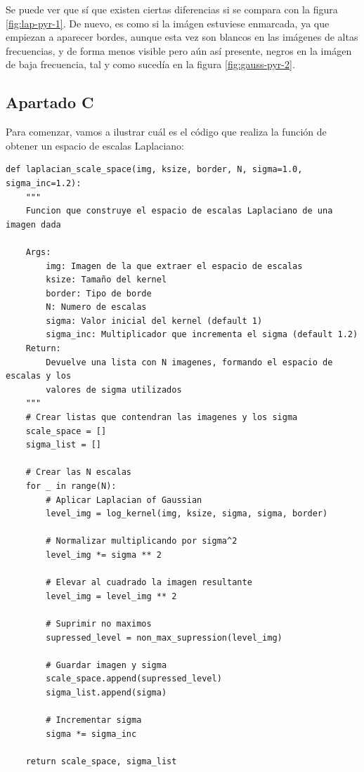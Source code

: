 \documentclass[11pt,a4paper]{article}
\begin{document}
Se puede ver que sí que existen ciertas diferencias si se compara con la figura \ref{fig:lap-pyr-1}. De nuevo, es como
si la imágen estuviese enmarcada, ya que empiezan a aparecer bordes, aunque esta vez son blancos en las imágenes de altas
frecuencias, y de forma menos visible pero aún así presente, negros en la imágen de baja frecuencia, tal y como sucedía en
la figura \ref{fig:gauss-pyr-2}. 

\subsection{Apartado C}

Para comenzar, vamos a ilustrar cuál es el código que realiza la función de obtener un espacio de escalas Laplaciano:

\begin{lstlisting}[caption={Función que crea un espacio de escalas Laplaciano},label={alg:lap-space-scale}]
def laplacian_scale_space(img, ksize, border, N, sigma=1.0, sigma_inc=1.2):
    """
    Funcion que construye el espacio de escalas Laplaciano de una imagen dada

    Args:
        img: Imagen de la que extraer el espacio de escalas
        ksize: Tamaño del kernel
        border: Tipo de borde
        N: Numero de escalas
        sigma: Valor inicial del kernel (default 1)
        sigma_inc: Multiplicador que incrementa el sigma (default 1.2)
    Return:
        Devuelve una lista con N imagenes, formando el espacio de escalas y los
        valores de sigma utilizados
    """
    # Crear listas que contendran las imagenes y los sigma
    scale_space = []
    sigma_list = []

    # Crear las N escalas
    for _ in range(N):
        # Aplicar Laplacian of Gaussian
        level_img = log_kernel(img, ksize, sigma, sigma, border)

        # Normalizar multiplicando por sigma^2
        level_img *= sigma ** 2

        # Elevar al cuadrado la imagen resultante
        level_img = level_img ** 2

        # Suprimir no maximos
        supressed_level = non_max_supression(level_img)

        # Guardar imagen y sigma
        scale_space.append(supressed_level)
        sigma_list.append(sigma)

        # Incrementar sigma
        sigma *= sigma_inc

    return scale_space, sigma_list
\end{lstlisting}
\end{document}
